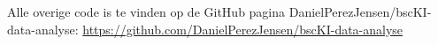 \documentclass{uva-inf-article}
\begin{document}
Alle overige code is te vinden op de GitHub pagina DanielPerezJensen/bscKI-data-analyse:     \url{https://github.com/DanielPerezJensen/bscKI-data-analyse}








\end{document}
